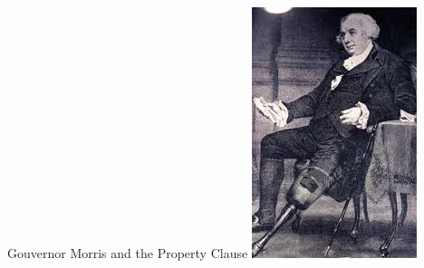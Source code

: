 %
%


\begin{frame}{Gouvernor Morris and the Property Clause}
    \centering
    \includegraphics[height=.8\textheight]{img/morris-full.png} \\
\end{frame}

